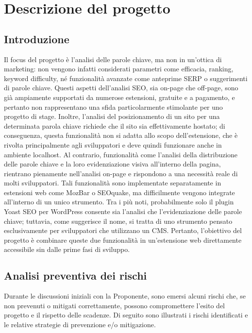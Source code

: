 \chapter{Descrizione del progetto}
\label{cap:descrizione-progetto}

\section{Introduzione}
\label{sec:introduzione-progetto}

\par Il focus del progetto è l’analisi delle parole chiave, ma non in un’ottica di marketing: non vengono infatti considerati parametri come efficacia, ranking, keyword difficulty, né funzionalità avanzate come anteprime SERP o suggerimenti di parole chiave. Questi aspetti dell’analisi SEO, sia on-page che off-page, sono già ampiamente supportati da numerose estensioni, gratuite e a pagamento, e pertanto non rappresentano una sfida particolarmente stimolante per uno progetto di stage. Inoltre, l’analisi del posizionamento di un sito per una determinata parola chiave richiede che il sito sia effettivamente hostato; di conseguenza, questa funzionalità non si adatta allo scopo dell’estensione, che è rivolta principalmente agli sviluppatori e deve quindi funzionare anche in ambiente localhost. Al contrario, funzionalità come l’analisi della distribuzione delle parole chiave e la loro evidenziazione visiva all’interno della pagina, rientrano pienamente nell’analisi on-page e rispondono a una necessità reale di molti sviluppatori. Tali funzionalità sono implementate separatamente in estensioni web come MozBar o SEOquake, ma difficilmente vengono integrate all’interno di un unico strumento. Tra i più noti, probabilmente solo il plugin Yoast SEO per WordPress consente sia l’analisi che l’evidenziazione delle parole chiave; tuttavia, come suggerisce il nome, si tratta di uno strumento pensato esclusivamente per sviluppatori che utilizzano un CMS. Pertanto, l’obiettivo del progetto è combinare queste due funzionalità in un’estensione web direttamente accessibile sin dalle prime fasi di sviluppo.

\section{Analisi preventiva dei rischi}
\label{sec:rischi}

\par Durante le discussioni iniziali con la Proponente, sono emersi alcuni rischi che, se non prevenuti o mitigati correttamente, possono compromettere l’esito del progetto e il rispetto delle scadenze. Di seguito sono illustrati i rischi identificati e le relative strategie di prevenzione e/o mitigazione.

